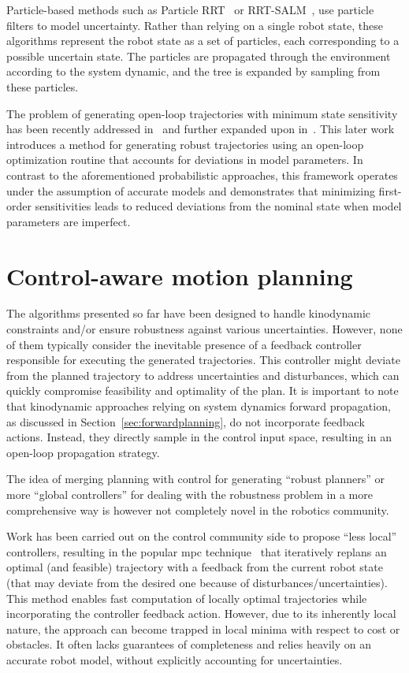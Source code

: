 Particle-based methods such as Particle RRT~\cite{cParticleRRT} or RRT-SALM~\cite{cSlamRRT}, use particle filters to model uncertainty. 
Rather than relying on a single robot state, these algorithms represent the robot state as a set of particles, each corresponding to a possible uncertain state. 
The particles are propagated through the environment according to the system dynamic, and the tree is expanded by sampling from these particles.

The problem of generating open-loop trajectories with minimum state sensitivity has been recently addressed in~\cite{cSensi1} and further expanded upon in~\cite{cSensi2}. 
This later work introduces a method for generating robust trajectories using an open-loop optimization routine that accounts for deviations in model parameters. 
In contrast to the aforementioned probabilistic approaches, this framework operates under the assumption of accurate models and demonstrates that minimizing first-order sensitivities leads to reduced deviations from the nominal state when model parameters are imperfect.

\section{Control-aware motion planning}

The algorithms presented so far have been designed to handle kinodynamic constraints and/or ensure robustness against various uncertainties.
However, none of them typically consider the inevitable presence of a feedback controller responsible for executing the generated trajectories. 
This controller might deviate from the planned trajectory to address uncertainties and disturbances, which can quickly compromise feasibility and optimality of the plan.
It is important to note that kinodynamic approaches relying on system dynamics forward propagation, as discussed in Section~\ref{sec:forwardplanning}, do not incorporate feedback actions.
Instead, they directly sample in the control input space, resulting in an open-loop propagation strategy.

The idea of merging planning with control for generating “robust planners” or more “global controllers” for dealing with the robustness problem in a more comprehensive way is however not completely novel in the robotics community.

Work has been carried out on the control community side to propose ``less local'' controllers, resulting in the popular \gls{mpc} technique~\cite{cMPC} that iteratively replans an optimal (and feasible) trajectory with a feedback from the current robot state (that may deviate from the desired one because of disturbances/uncertainties). 
This method enables fast computation of locally optimal trajectories while incorporating the controller feedback action. 
However, due to its inherently local nature, the  approach can become trapped in local minima with respect to cost or obstacles. 
It often lacks guarantees of completeness and relies heavily on an accurate robot model, without explicitly accounting for uncertainties.

